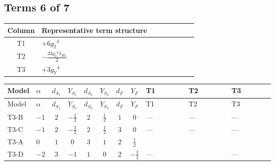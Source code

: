 \documentclass[8pt]{article}
\begin{document}
\begin{landscape}
\subsection*{Terms 6 of 7}
\begin{center}
\begin{tabular}{@{}c >{\raggedright\arraybackslash}p{0.82\linewidth}@{}}
\toprule
Column & Representative term structure \\
\midrule
T1 & \(\displaystyle +6 {g_2}^4\) \\
\midrule
T2 & \(\displaystyle -\frac{33 {g_2}^2 {\lambda_{H2}}}{2}\) \\
\midrule
T3 & \(\displaystyle +3 {g_Y}^4\) \\
\midrule
\bottomrule
\end{tabular}
\end{center}
\smallskip
\tiny
\begin{longtable}{@{}llcccccc >{\raggedright\arraybackslash}p{0.21\linewidth} >{\raggedright\arraybackslash}p{0.21\linewidth} >{\raggedright\arraybackslash}p{0.21\linewidth}@{}}
\toprule
Model & $\alpha$ & $d_{S_1}$ & $Y_{S_1}$ & $d_{S_2}$ & $Y_{S_2}$ & $d_F$ & $Y_F$ & T1 & T2 & T3 \\
\midrule
\endfirsthead
\toprule
Model & $\alpha$ & $d_{S_1}$ & $Y_{S_1}$ & $d_{S_2}$ & $Y_{S_2}$ & $d_F$ & $Y_F$ & T1 & T2 & T3 \\
\midrule
\endhead
T3-B & $-1$ & $2$ & $-\frac{1}{2}$ & $2$ & $\frac{1}{2}$ & $1$ & $0$ & --- & --- & --- \\
\midrule
T3-C & $-1$ & $2$ & $-\frac{1}{2}$ & $2$ & $\frac{1}{2}$ & $3$ & $0$ & --- & --- & --- \\
\midrule
T3-A & $0$ & $1$ & $0$ & $3$ & $1$ & $2$ & $\frac{1}{2}$ & \scriptsize\adjustbox{max width=\linewidth}{$\begin{gathered} +6 {g_2}^4\end{gathered}$} & \scriptsize\adjustbox{max width=\linewidth}{$\begin{gathered} -\frac{33 {g_2}^2 {\lambda_{H2}}}{2}\end{gathered}$} & \scriptsize\adjustbox{max width=\linewidth}{$\begin{gathered} +3 {g_Y}^4\end{gathered}$} \\
\midrule
T3-D & $-2$ & $3$ & $-1$ & $1$ & $0$ & $2$ & $-\frac{1}{2}$ & --- & \scriptsize\adjustbox{max width=\linewidth}{$\begin{gathered} -\frac{9 {g_2}^2 {\lambda_{H2}}}{2}\end{gathered}$} & --- \\

\end{longtable}
\end{landscape}
\end{document}
